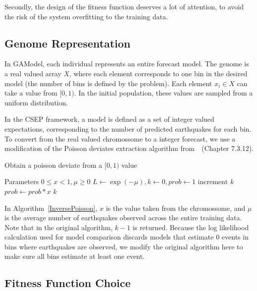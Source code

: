 \documentclass{sig-alternate}
\begin{document}
Secondly, the design of the fitness function deserves a lot of
attention, to avoid the risk of the system overfitting to the training
data.

\subsection{Genome Representation}

In GAModel, each individual represents an entire forecast model. The
genome is a real valued array $X$, where each element corresponds to
one bin in the desired model (the number of bins is defined by the
problem). Each element $x_i \in X$ can take a value from $[0,1)$. In
  the initial population, these values are sampled from a uniform
  distribution.

In the CSEP framework, a model is defined as a set of integer valued
expectations, corresponding to the number of predicted earthquakes for
each bin. To convert from the real valued chromossome to a integer
forecast, we use a modification of the Poisson deviates extraction
algorithm from~\cite{NumericalRecipes}~(Chapter 7.3.12).

\begin{algorithm}
  \caption{Obtain a poisson deviate from a $[0,1)$ value}
  \label{InversePoisson}
  \begin{algorithmic}
    \STATE Parameters $0 \leq x < 1, \mu \geq 0$
    \STATE $L \gets \exp{(-\mu)}, k \gets 0, prob \gets 1$
    \REPEAT 
    \STATE $\text{increment }k$
    \STATE $prob \gets prob*x$
    \RETURN $k$
  \end{algorithmic}
\end{algorithm}

In Algorithm~\ref{InversePoisson}, $x$ is the value taken from the
chromossome, and $\mu$ is the average number of earthquakes observed
across the entire training data. Note that in the original algorithm,
$k-1$ is returned. Because the log likelihood calculation used for
model comparison discards models that estimate 0 events in bins where
earthquakes are observed, we modify the original algorithm here to
make sure all bins estimate at least one event. 


\subsection{Fitness Function Choice}
\end{document}
